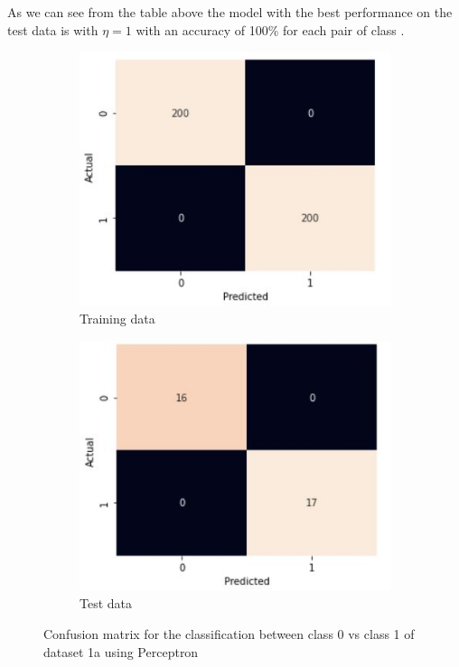 \documentclass[11pt]{article}
\begin{document}
As we can see from the table above the model with the best performance on the test data is with  $\eta =1$ with an accuracy of 100\% for each pair of class .
\begin{figure}[h]
\centering
	\begin{subfigure}[b]{0.45\textwidth}
	\centering
	\includegraphics[scale=0.45]{dataset1a_perceptron_01_cm_train.jpg}
	\caption{Training data}
	\label{fig:fig1.1.1.1}
	\end{subfigure}
	\begin{subfigure}[b]{0.45\textwidth}
	\centering
	\includegraphics[scale=0.45]{dataset1a_perceptron_01_cm_test.jpg}
	\caption{Test data}
	\label{fig:fig1.1.1.2}
	\end{subfigure}
\caption{Confusion matrix for the classification between class 0 vs class 1 of dataset 1a using Perceptron}
\label{fig:fig1.1.1}
\end{figure}
\end{document}
